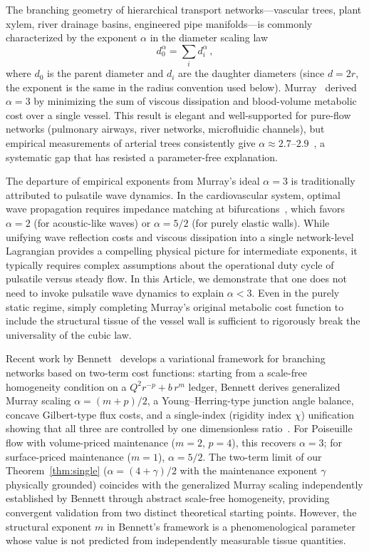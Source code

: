\documentclass[11pt,a4paper]{article}
\theoremstyle{remark}
\begin{document}
The branching geometry of hierarchical transport networks---vascular trees,
plant xylem, river drainage basins, engineered pipe manifolds---is commonly
characterized by the exponent $\alpha$ in the diameter scaling law
\begin{equation}
  d_0^\alpha = \sum_i d_i^\alpha\,,
  \label{eq:murray}
\end{equation}
where $d_0$ is the parent diameter and $d_i$ are the daughter diameters
(since $d=2r$, the exponent is the same in the radius convention used below).
Murray~\cite{Murray1926} derived $\alpha=3$ by minimizing the sum of viscous
dissipation and blood-volume metabolic cost over a single vessel.
This result is elegant and well-supported for pure-flow networks (pulmonary
airways, river networks, microfluidic channels), but empirical measurements
of arterial trees consistently give $\alpha\approx2.7$--$2.9$~\cite{Kassab1993,
Zamir1999}, a systematic gap that has resisted a parameter-free explanation.

The departure of empirical exponents from Murray's ideal $\alpha=3$ is
traditionally attributed to pulsatile wave dynamics. In the cardiovascular
system, optimal wave propagation requires impedance matching at
bifurcations~\cite{Nichols2011}, which favors $\alpha=2$ (for acoustic-like
waves) or $\alpha=5/2$ (for purely elastic walls). While unifying wave
reflection costs and viscous dissipation into a single network-level
Lagrangian provides a compelling physical picture for intermediate exponents,
it typically requires complex assumptions about the operational duty cycle of
pulsatile versus steady flow. In this Article, we demonstrate that one does
not need to invoke pulsatile wave dynamics to explain $\alpha < 3$. Even in
the purely static regime, simply completing Murray's original metabolic cost
function to include the structural tissue of the vessel wall is sufficient
to rigorously break the universality of the cubic law.

Recent work by Bennett~\cite{bennett2025} develops a variational
framework for branching networks based on two-term cost functions: starting
from a scale-free homogeneity condition on a $Q^2 r^{-p} + b\,r^m$ ledger,
Bennett derives generalized Murray scaling $\alpha=(m{+}p)/2$, a
Young--Herring-type junction angle balance, concave Gilbert-type flux costs,
and a single-index (rigidity index $\chi$) unification showing that all three
are controlled by one dimensionless ratio~\cite{bennett2025}. For Poiseuille
flow with volume-priced maintenance ($m=2$, $p=4$), this recovers $\alpha=3$;
for surface-priced maintenance ($m=1$), $\alpha=5/2$. The two-term limit of
our Theorem~\ref{thm:single} ($\alpha = (4{+}\gamma)/2$ with the maintenance
exponent $\gamma$ physically grounded) coincides with the generalized Murray
scaling independently established by Bennett through abstract scale-free
homogeneity, providing convergent validation from two distinct theoretical
starting points. However, the structural exponent $m$ in Bennett's framework
is a phenomenological parameter whose value is not predicted from independently
measurable tissue quantities.
\end{document}

